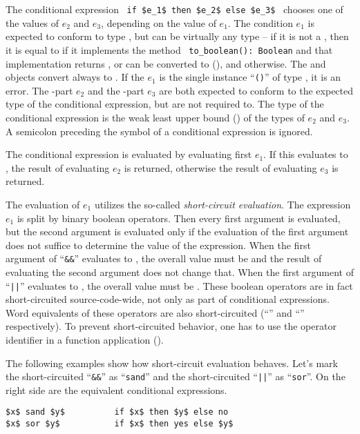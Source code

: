 The conditional expression ~\lstinline!if $e_1$ then $e_2$ else $e_3$!~ chooses one of the values of $e_2$ and $e_3$, depending on the value of $e_1$. The condition $e_1$ is expected to conform to type , but can be virtually any type -- if it is not a , then it is equal to  if it implements the method ~\lstinline!to_boolean(): Boolean! and that implementation returns , or can be converted to  (), and  otherwise. The  and  objects convert always to . If the $e_1$ is the single instance ``\lstinline!()!'' of type , it is an error. The -part $e_2$ and the -part $e_3$ are both expected to conform to the expected type of the conditional expression, but are not required to. The type of the conditional expression is the weak least upper bound () of the types of $e_2$ and $e_3$. A semicolon preceding the  symbol of a conditional expression is ignored. 

The conditional expression is evaluated by evaluating first $e_1$. If this evaluates to , the result of evaluating $e_2$ is returned, otherwise the result of evaluating $e_3$ is returned. 

The evaluation of $e_1$ utilizes the so-called {\em short-circuit evaluation}. The expression $e_1$ is split by binary boolean operators. Then every first argument is evaluated, but the second argument is evaluated only if the evaluation of the first argument does not suffice to determine the value of the expression. When the first argument of ``\lstinline!&&!'' evaluates to , the overall value must be  and the result of evaluating the second argument does not change that. When the first argument of ``\lstinline!||!'' evaluates to , the overall value must be . These boolean operators are in fact short-circuited source-code-wide, not only as part of conditional expressions. Word equivalents of these operators are also short-circuited (``'' and ``'' respectively). To prevent short-circuited behavior, one has to use the operator identifier in a function application ().

\example The following examples show how short-circuit evaluation behaves. Let's mark the short-circuited ``\lstinline!&&!'' as ``\lstinline!sand!'' and the short-circuited ``\lstinline!||!'' as ``\lstinline!sor!''. On the right side are the equivalent conditional expressions. 
\begin{lstlisting}
$x$ sand $y$          if $x$ then $y$ else no
$x$ sor $y$           if $x$ then yes else $y$
\end{lstlisting}

